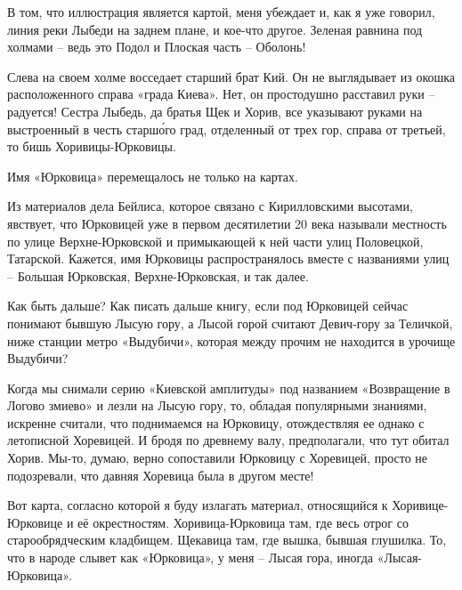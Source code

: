 В том, что иллюстрация является картой, меня убеждает и, как я уже говорил, линия реки Лыбеди на заднем плане, и кое-что другое. Зеленая равнина под холмами – ведь это Подол и Плоская часть – Оболонь!

Слева на своем холме восседает старший брат Кий. Он не выглядывает из окошка расположенного справа «града Киева». Нет, он простодушно расставил руки – радуется! Сестра Лыбедь, да братья Щек и Хорив, все указывают руками на выстроенный в честь старш\'ого град, отделенный от трех гор, справа от третьей, то бишь Хоривицы-Юрковицы.

Имя «Юрковица» перемещалось не только на картах.

Из материалов дела Бейлиса, которое связано с Кирилловскими высотами, явствует, что Юрковицей уже в первом десятилетии 20 века называли местность по улице Верхне-Юрковской и примыкающей к ней части улиц Половецкой, Татарской. Кажется, имя Юрковицы распространялось вместе с названиями улиц – Большая Юрковская, Верхне-Юрковская, и так далее.

Как быть дальше? Как писать дальше книгу, если под Юрковицей сейчас понимают бывшую Лысую гору, а Лысой горой считают Девич-гору за Теличкой, ниже станции метро «Выдубичи», которая между прочим не находится в урочище Выдубичи?


Когда мы снимали серию «Киевской амплитуды» под названием «Возвращение в Логово змиево» и лезли на Лысую гору, то, обладая популярными знаниями, искренне считали, что поднимаемся на Юрковицу, отождествляя ее однако с летописной Хоревицей. И бродя по древнему валу, предполагали, что тут обитал Хорив. Мы-то, думаю, верно сопоставили Юрковицу с Хоревицей, просто не подозревали, что давняя Хоревица была в другом месте!

Вот карта, согласно которой я буду излагать материал, относящийся к Хоривице-Юрковице и её окрестностям. Хоривица-Юрковица там, где весь отрог со старообрядческим кладбищем. Щекавица там, где вышка, бывшая глушилка. То, что в народе слывет как «Юрковица», у меня – Лысая гора, иногда «Лысая-Юрковица».

